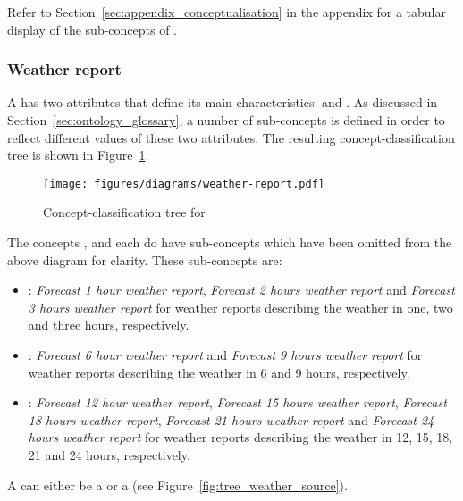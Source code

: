 Refer to Section~\ref{sec:appendix_conceptualisation} in the appendix for a tabular display of the sub-concepts of .

\subsubsection{Weather report}

A  has two attributes that define its main characteristics:  and . As discussed in Section~\ref{sec:ontology_glossary}, a number of sub-concepts is defined in order to reflect different values of these two attributes. The resulting concept-classification tree is shown in Figure~\ref{fig:tree_weather_report}.

\begin{figure}
  \centering
  \texttt{[image: figures/diagrams/weather-report.pdf]}
  \caption{Concept-classification tree for }
  \label{fig:tree_weather_report}
\end{figure}

The concepts ,  and  each do have sub-concepts which have been omitted from the above diagram for clarity. These sub-concepts are:
\begin{itemize}
  \item {}: \emph{Forecast 1 hour weather report}, \emph{Forecast 2 hours weather report} and \emph{Forecast 3 hours weather report} for weather reports describing the weather in one, two and three hours, respectively.
  \item {}: \emph{Forecast 6 hour weather report} and \emph{Forecast 9 hours weather report} for weather reports describing the weather in 6 and 9 hours, respectively.
  \item {}: \emph{Forecast 12 hour weather report}, \emph{Forecast 15 hours weather report}, \emph{Forecast 18 hours weather report}, \emph{Forecast 21 hours weather report} and \emph{Forecast 24 hours weather report} for weather reports describing the weather in 12, 15, 18, 21 and 24 hours, respectively.
\end{itemize}

A  can either be a  or a  (see Figure~\ref{fig:tree_weather_source}).

